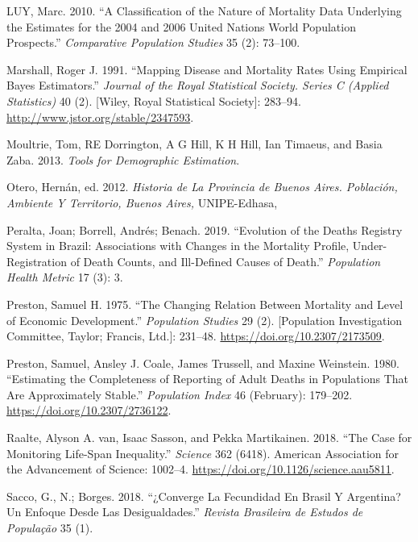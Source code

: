 \documentclass[12pt,]{article}
\begin{document}
\leavevmode\hypertarget{ref-Luy2010}{}%
LUY, Marc. 2010. ``A Classification of the Nature of Mortality Data
Underlying the Estimates for the 2004 and 2006 United Nations World
Population Prospects.'' \emph{Comparative Population Studies} 35 (2):
73--100.

\leavevmode\hypertarget{ref-Marshall1991}{}%
Marshall, Roger J. 1991. ``Mapping Disease and Mortality Rates Using
Empirical Bayes Estimators.'' \emph{Journal of the Royal Statistical
Society. Series C (Applied Statistics)} 40 (2). {[}Wiley, Royal
Statistical Society{]}: 283--94.
\url{http://www.jstor.org/stable/2347593}.

\leavevmode\hypertarget{ref-Moultrie}{}%
Moultrie, Tom, RE Dorrington, A G Hill, K H Hill, Ian Timaeus, and Basia
Zaba. 2013. \emph{Tools for Demographic Estimation}.

\leavevmode\hypertarget{ref-Otero2012}{}%
Otero, Hernán, ed. 2012. \emph{Historia de La Provincia de Buenos Aires.
Población, Ambiente Y Territorio, Buenos Aires,} UNIPE-Edhasa,

\leavevmode\hypertarget{ref-Peralta2019}{}%
Peralta, Joan; Borrell, Andrés; Benach. 2019. ``Evolution of the Deaths
Registry System in Brazil: Associations with Changes in the Mortality
Profile, Under-Registration of Death Counts, and Ill-Defined Causes of
Death.'' \emph{Population Health Metric} 17 (3): 3.

\leavevmode\hypertarget{ref-Preston_1975}{}%
Preston, Samuel H. 1975. ``The Changing Relation Between Mortality and
Level of Economic Development.'' \emph{Population Studies} 29 (2).
{[}Population Investigation Committee, Taylor; Francis, Ltd.{]}:
231--48. \url{https://doi.org/10.2307/2173509}.

\leavevmode\hypertarget{ref-Preston1980}{}%
Preston, Samuel, Ansley J. Coale, James Trussell, and Maxine Weinstein.
1980. ``Estimating the Completeness of Reporting of Adult Deaths in
Populations That Are Approximately Stable.'' \emph{Population Index} 46
(February): 179--202. \url{https://doi.org/10.2307/2736122}.

\leavevmode\hypertarget{ref-van_Raalte1002}{}%
Raalte, Alyson A. van, Isaac Sasson, and Pekka Martikainen. 2018. ``The
Case for Monitoring Life-Span Inequality.'' \emph{Science} 362 (6418).
American Association for the Advancement of Science: 1002--4.
\url{https://doi.org/10.1126/science.aau5811}.

\leavevmode\hypertarget{ref-SaccoBorges2018}{}%
Sacco, G., N.; Borges. 2018. ``¿Converge La Fecundidad En Brasil Y
Argentina? Un Enfoque Desde Las Desigualdades.'' \emph{Revista
Brasileira de Estudos de População} 35 (1).
\end{document}
